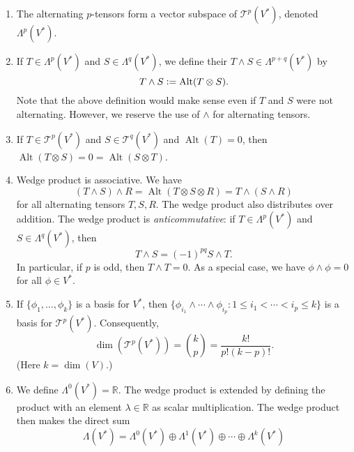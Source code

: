 \documentclass[12pt]{article}
\newcommand{\T}{\mathscr{T}}
\DeclareMathOperator{\Alt}{Alt}
\begin{document}
\begin{enumerate}[leftmargin=*]
	\item The alternating $p$-tensors form a vector subspace of $\T^{p}(V^{\ast})$, denoted $\Lambda^{p}(V^{\ast})$. 
	\item If $T \in \Lambda^{p}(V^{\ast})$ and $S \in \Lambda^{q}(V^{\ast})$, we define their  $T \wedge S \in \Lambda^{p + q}(V^{\ast})$ by
	\begin{equation*} 
		T \wedge S \vcentcolon= \Alt(T \otimes S).
	\end{equation*}
	Note that the above definition would make sense even if $T$ and $S$ were not alternating. However, we reserve the use of $\wedge$ for alternating tensors.
	\item If $T \in \T^{p}(V^{\ast})$ and $S \in \T^{q}(V^{\ast})$ and $\Alt(T) = 0$, then $\Alt(T \otimes S) = 0 = \Alt(S \otimes T)$. 
	\item Wedge product is associative. We have
	\begin{equation*} 
		(T \wedge S) \wedge R = \Alt(T \otimes S \otimes R) = T \wedge (S \wedge R)
	\end{equation*}
	for all alternating tensors $T, S, R$. \newline
	The wedge product also distributes over addition. \newline
	The wedge product is \emph{anticommutative}: if $T \in \Lambda^{p}(V^{\ast})$ and $S \in \Lambda^{q}(V^{\ast})$, then
	\begin{equation*} 
		T \wedge S = (-1)^{pq} S \wedge T.
	\end{equation*}
	In particular, if $p$ is odd, then $T \wedge T = 0$. As a special case, we have $\phi \wedge \phi = 0$ for all $\phi \in V^{\ast}$.
	\item If $\{\phi_{1}, \ldots, \phi_{k}\}$ is a basis for $V^{\ast}$, then $\{\phi_{i_{1}} \wedge \cdots \wedge \phi_{i_{p}} : 1 \le i_{1} < \cdots < i_{p} \le k\}$ is a basis for $\T^{p}(V^{\ast})$. Consequently, 
	\begin{equation*} 
		\dim(\T^{p}(V^{\ast})) = \binom{k}{p} = \frac{k!}{p! (k - p)!}.
	\end{equation*}
	(Here $k = \dim(V)$.)
	\item We define $\Lambda^{0}(V^{\ast}) = \mathbb{R}$. The wedge product is extended by defining the product with an element $\lambda \in \mathbb{R}$ as scalar multiplication. The wedge product then makes the direct sum
	\begin{equation*} 
		\Lambda(V^{\ast}) = \Lambda^{0}(V^{\ast}) \oplus \Lambda^{1}(V^{\ast}) \oplus \cdots \oplus \Lambda^{k}(V^{\ast})

\end{equation*}
\end{enumerate}
\end{document}
